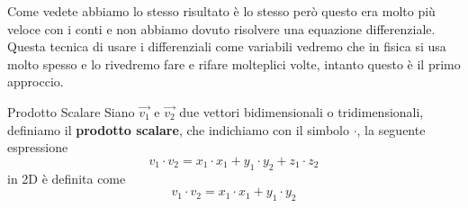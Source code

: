 \documentclass{rapport}
\begin{document}
Come vedete abbiamo lo stesso risultato è lo stesso però questo era molto più veloce con i conti e non abbiamo dovuto risolvere una equazione differenziale. Questa tecnica di usare i differenziali come variabili vedremo che in fisica si usa molto spesso e lo rivedremo fare e rifare molteplici volte, intanto questo è il primo approccio.


















\newpage
\begin{definizione}{Prodotto Scalare }{}
  Siano $\vec{v_1}$ e $\vec{v_2}$ due vettori bidimensionali o tridimensionali, definiamo il \textbf{prodotto scalare}, che indichiamo con il simbolo $\cdot$, la seguente espressione
  \[
    v_1\cdot v_2 = x_1\cdot x_1 + y_1\cdot y_2 + z_1\cdot z_2 
  \]
  in 2D è definita come
  \[
   v_1\cdot v_2 = x_1\cdot x_1 + y_1\cdot y_2 
   \]
\end{definizione}
\end{document}
